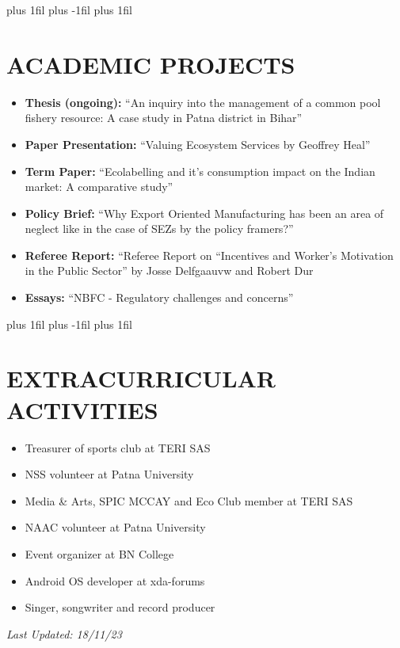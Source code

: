 \documentclass[a4paper,9pt]{extarticle}
\begin{document}
	\leftskip=0pt plus 1fil %
	\rightskip=0pt plus -1fil %
	\parfillskip=0pt plus 1fil %
	\section*{ACADEMIC PROJECTS}
	\noindent
	\begin{itemize}
		\item \textbf{Thesis (ongoing):} \enquote{An inquiry into the management of a common pool fishery resource: A case study in Patna district in Bihar}
		\item \textbf{Paper Presentation:} \enquote{Valuing Ecosystem Services by Geoffrey Heal}
		\item \textbf{Term Paper:} \enquote{Ecolabelling and it’s consumption impact on the Indian market: A comparative study}
		\item \textbf{Policy Brief:} \enquote{Why Export Oriented Manufacturing has been an area of neglect like in the case of SEZs by the policy framers?}
		\item \textbf{Referee Report:} \enquote{Referee Report on “Incentives and Worker’s Motivation in the Public Sector} by Josse Delfgaauvw and Robert Dur
		\item \textbf{Essays:} \enquote{NBFC - Regulatory challenges and concerns} 
	\end{itemize}
	
        \leftskip=0pt plus 1fil %
	\rightskip=0pt plus -1fil %
	\parfillskip=0pt plus 1fil %
	\section*{EXTRACURRICULAR ACTIVITIES}
	\begin{itemize}
		\item Treasurer of sports club at TERI SAS
		\item NSS volunteer at Patna University
		\item Media \& Arts, SPIC MCCAY and Eco Club member at TERI SAS
		\item NAAC volunteer at Patna University
		\item Event organizer at BN College
		\item Android OS developer at xda-forums
		\item Singer, songwriter and record producer 
	\end{itemize}
	
	\raggedleft
	\vspace{2mm} %
	{\textit{Last Updated: 18/11/23}}
	
\end{document}
